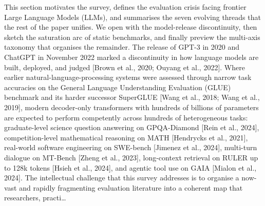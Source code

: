 This section motivates the survey, defines the evaluation crisis facing frontier Large Language Models (LLMs), and summarises the seven evolving threads that the rest of the paper unifies. We open with the model-release discontinuity, then sketch the saturation arc of static benchmarks, and finally preview the multi-axis taxonomy that organises the remainder. The release of GPT-3 in 2020 and ChatGPT in November 2022 marked a discontinuity in how language models are built, deployed, and judged {[}Brown et al., 2020; Ouyang et al., 2022{]}. Where earlier natural-language-processing systems were assessed through narrow task accuracies on the General Language Understanding Evaluation (GLUE) benchmark and its harder successor SuperGLUE {[}Wang et al., 2018; Wang et al., 2019{]}, modern decoder-only transformers with hundreds of billions of parameters are expected to perform competently across hundreds of heterogeneous tasks: graduate-level science question answering on GPQA-Diamond {[}Rein et al., 2024{]}, competition-level mathematical reasoning on MATH {[}Hendrycks et al., 2021{]}, real-world software engineering on SWE-bench {[}Jimenez et al., 2024{]}, multi-turn dialogue on MT-Bench {[}Zheng et al., 2023{]}, long-context retrieval on RULER up to 128k tokens {[}Hsieh et al., 2024{]}, and agentic tool use on GAIA {[}Mialon et al., 2024{]}. The intellectual challenge that this survey addresses is to organise a now-vast and rapidly fragmenting evaluation literature into a coherent map that researchers, practi\ldots{}
